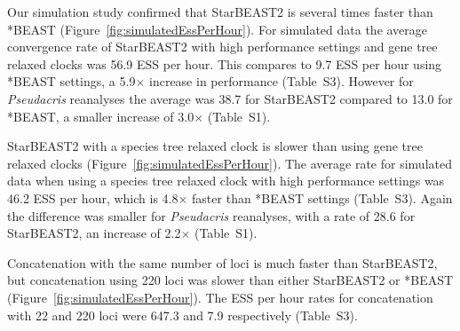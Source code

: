 \documentclass[nogrid]{MBE}%
\begin{document}
Our simulation study confirmed that StarBEAST2 is several times faster than
*BEAST (Figure~\ref{fig:simulatedEssPerHour}). For simulated data the average
convergence rate of StarBEAST2 with high performance settings and gene tree
relaxed clocks was 56.9 ESS per hour. This compares to 9.7 ESS per hour
using *BEAST settings, a 5.9$\times$ increase in performance (Table~S3). However
for \textit{Pseudacris} reanalyses the average was 38.7 for StarBEAST2 compared
to 13.0 for *BEAST, a smaller increase of 3.0$\times$ (Table~S1).

StarBEAST2 with a species tree relaxed clock is slower than using gene tree relaxed
clocks (Figure~\ref{fig:simulatedEssPerHour}). The average rate for simulated
data when using a species tree relaxed clock with high performance settings was
46.2 ESS per hour, which is 4.8$\times$ faster than *BEAST settings (Table~S3). Again
the difference was smaller for \textit{Pseudacris} reanalyses, with a rate of
28.6 for StarBEAST2, an increase of 2.2$\times$ (Table~S1).

Concatenation with the same number of loci is much faster than StarBEAST2, but
concatenation using 220 loci was slower than either StarBEAST2 or *BEAST (Figure~\ref{fig:simulatedEssPerHour}). The ESS per hour rates for
concatenation with 22 and 220 loci were 647.3 and 7.9 respectively (Table~S3).
\end{document}
